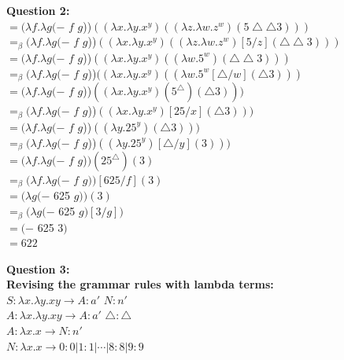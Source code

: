 \documentclass[12pt,a4paper]{article}
\begin{document}
\noindent \textbf{Question 2:}\\
$=(\lambda f. \lambda g (-$ $f$ $g$))$((\lambda x. \lambda y.x^{y})((\lambda z. \lambda w.z^{w})(5\bigtriangleup \bigtriangleup 3)))$\\
$=_{\beta}(\lambda f. \lambda g (-$ $f$ $g$))$((\lambda x. \lambda y.x^{y})((\lambda z. \lambda w.z^{w})[5/z](\bigtriangleup \bigtriangleup 3)))$\\
$=(\lambda f. \lambda g (-$ $f$ $g$))$((\lambda x. \lambda y.x^{y})((\lambda w.5^{w})(\bigtriangleup \bigtriangleup 3)))$\\
$=_{\beta}(\lambda f. \lambda g (-$ $f$ $g$))$((\lambda x. \lambda y.x^{y})((\lambda w.5^{w}[\bigtriangleup/w](\bigtriangleup 3)))$\\
$=(\lambda f. \lambda g (-$ $f$ $g$))$((\lambda x. \lambda y.x^{y})(5^{\bigtriangleup})(\bigtriangleup 3)))$\\
$=_{\beta}(\lambda f. \lambda g (-$ $f$ $g$))$((\lambda x. \lambda y.x^{y})[25/x](\bigtriangleup 3)))$\\
$=(\lambda f. \lambda g (-$ $f$ $g$))$((\lambda y.25^{y})(\bigtriangleup 3)))$\\
$=_{\beta}(\lambda f. \lambda g (-$ $f$ $g$))$((\lambda y.25^{y})[\bigtriangleup/y](3)))$\\
$=(\lambda f. \lambda g (-$ $f$ $g$)$)(25^{\bigtriangleup})(3)$\\
$=_{\beta}(\lambda f. \lambda g (-$ $f$ $g))[625/f](3)$\\
$=(\lambda g (-$ 625 $g))(3)$\\
$=_{\beta} (\lambda g(-$ 625 $g) [3/g])$\\
$=(-$ 625 $3)$\\
$=622$

\clearpage

\noindent \textbf{Question 3:}\\

\noindent \textbf{Revising the grammar rules with lambda terms:}\\
$S: \lambda x.\lambda y.xy \rightarrow A:a'$ $N:n'$\\
$A: \lambda x.\lambda y.xy \rightarrow A:a'$ $\bigtriangleup:\bigtriangleup$\\
$A: \lambda x.x \rightarrow N:n'$\\
$N: \lambda x.x \rightarrow 0:0|1:1|\cdots |8:8|9:9$\\
\end{document}
